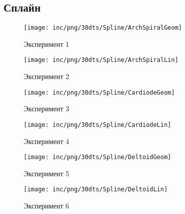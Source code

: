 \subsection{Сплайн}
\begin{figure}  
	\begin{minipage}{0,5\textwidth}
		\texttt{[image: inc/png/30dts/Spline/ArchSpiralGeom]}
		\label{fig:app1}
		\caption{Эксперимент 1}
	\end{minipage}
	\begin{minipage}{0,5\textwidth}
		\texttt{[image: inc/png/30dts/Spline/ArchSpiralLin]}
		\label{fig:app2}
		\caption{Эксперимент 2}
	\end{minipage}
	
	\begin{minipage}{0,5\textwidth}
		\texttt{[image: inc/png/30dts/Spline/CardiodeGeom]}
		\label{fig:app3}
		\caption{Эксперимент 3}
	\end{minipage}
	\begin{minipage}{0,5\textwidth}
		\texttt{[image: inc/png/30dts/Spline/CardiodeLin]}
		\label{fig:app4}
		\caption{Эксперимент 4}
	\end{minipage}
	
	\begin{minipage}{0,5\textwidth}
		\texttt{[image: inc/png/30dts/Spline/DeltoidGeom]}
		\label{fig:app1}
		\caption{Эксперимент 5}
	\end{minipage}
	\begin{minipage}{0,5\textwidth}
		\texttt{[image: inc/png/30dts/Spline/DeltoidLin]}
		\label{fig:app2}
		\caption{Эксперимент 6}
	\end{minipage}
\end{figure}


